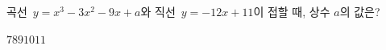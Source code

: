 곡선~$y=x^3-3x^2-9x+a$와 직선~$y=-12x+11$이 접할 때, 상수 $a$의 값은?
\begin{choices32}{$7$}{$8$}{$9$}{$10$}{$11$}\end{choices32}
